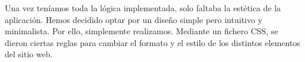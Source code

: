 \documentclass{article}
\begin{document}
Una vez teníamos toda la lógica implementada, solo faltaba la estética de la aplicación. Hemos decidido optar por un diseño simple pero intuitivo y minimalista. Por ello,
simplemente realizamos. Mediante un fichero CSS, se dieron ciertas reglas para cambiar el formato y el estilo de los distintos elementos del sitio web.
\end{document}
